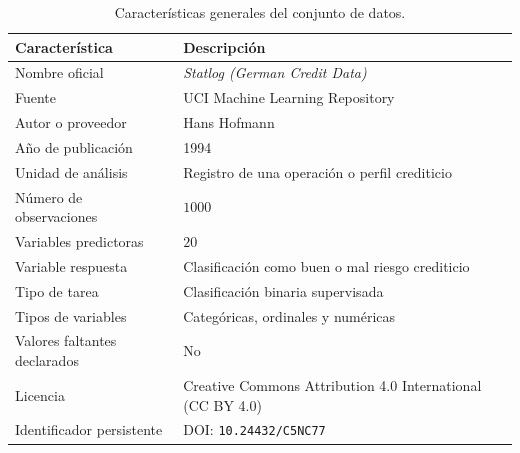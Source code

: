 \begin{table}[H]
    \centering
    \caption{Características generales del conjunto de datos.}
    \label{tab:resumen-dataset}

    \begin{tabularx}{0.90\textwidth}{
        @{}
        >{\raggedright\arraybackslash}p{4.3cm}
        X
        @{}
    }
        \toprule
        Característica & Descripción \\
        \midrule
        Nombre oficial
            & \textit{Statlog (German Credit Data)} \\

        Fuente
            & UCI Machine Learning Repository \\

        Autor o proveedor
            & Hans Hofmann \\

        Año de publicación
            & 1994 \\

        Unidad de análisis
            & Registro de una operación o perfil crediticio \\

        Número de observaciones
            & \(1000\) \\

        Variables predictoras
            & \(20\) \\

        Variable respuesta
            & Clasificación como buen o mal riesgo crediticio \\

        Tipo de tarea
            & Clasificación binaria supervisada \\

        Tipos de variables
            & Categóricas, ordinales y numéricas \\

        Valores faltantes declarados
            & No \\

        Licencia
            & Creative Commons Attribution 4.0 International
              (CC BY 4.0) \\

        Identificador persistente
            & DOI: \texttt{10.24432/C5NC77} \\
        \bottomrule
    \end{tabularx}
\end{table}

